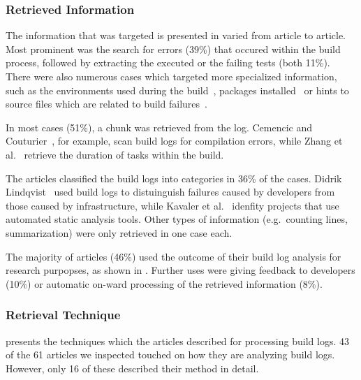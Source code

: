 \subsubsection{Retrieved Information}
The information that was targeted is presented in
 varied from article to article.
Most prominent was the search for errors (39\%) that occured within
the build process, followed by extracting the executed or the failing
tests (both 11\%).
There were also numerous cases which targeted more specialized
information, such as the environments used during the
build~\cite{zolfagharinia2017not}, packages
installed~\cite{selberg2012use} or hints to source files which are
related to build failures~\cite{ren2018automated}.

In most cases (51\%), a chunk was retrieved from the log.
Cemencic and Couturier~\cite{clemencic2014new}, for example,
scan build logs for compilation errors, while Zhang et
al.~\cite{zhang2016android} retrieve the duration of
tasks within the build.

The articles classified the build logs into categories in 36\% of
the cases.
Didrik Lindqvist~\cite{lindqvist2019detection} used build logs to
distuinguish failures caused by
developers from those caused by infrastructure, while
Kavaler et al.~\cite{kavaler2019tool} idenfity projects that use
automated static analysis tools.
Other types of information (e.g.\ counting
lines, summarization) were only retrieved
in one case each.

The majority of articles (46\%) used the outcome of their build log
analysis for research purpopses, as shown in .
Further uses were giving feedback to developers (10\%) or automatic
on-ward processing of the retrieved information (8\%).

\subsubsection{Retrieval Technique}
 presents the techniques which the articles
described for processing build logs.
43 of the 61 articles we inspected touched on how they are analyzing build
logs.
However, only 16 of these described their method in detail.

